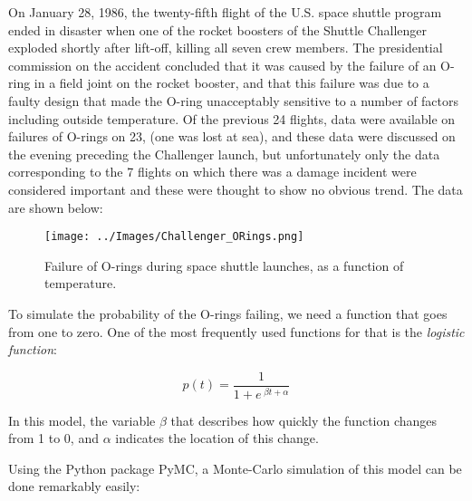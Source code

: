 On January 28, 1986, the twenty-fifth flight of the U.S. space shuttle program ended in disaster when one of the rocket boosters of the Shuttle Challenger exploded shortly after lift-off, killing all seven crew members. The presidential commission on the accident concluded that it was caused by the failure of an O-ring in a field joint on the rocket booster, and that this failure was due to a faulty design that made the O-ring unacceptably sensitive to a number of factors including outside temperature. Of the previous 24 flights, data were available on failures of O-rings on 23, (one was lost at sea), and these data were discussed on the evening preceding the Challenger launch, but unfortunately only the data corresponding to the 7 flights on which there was a damage incident were considered important and these were thought to show no obvious trend. The data are shown below:

\begin{figure}[H]
  \centering
  \texttt{[image: ../Images/Challenger\_ORings.png]}\\
  \caption{Failure of O-rings during space shuttle launches, as a function of temperature.}
\end{figure}

To simulate the probability of the O-rings failing, we need a function that goes from one to zero. One of the most frequently used functions for that is the \emph{logistic function}:

\begin{equation*}
  p(t) = \frac{1}{ 1 + e^{ \;\beta t + \alpha } }
\end{equation*}

In this model, the variable $\beta$ that describes how quickly the function changes from 1 to 0, and $\alpha$ indicates the location of this change.

Using the Python package PyMC, a Monte-Carlo simulation of this model can be done remarkably easily:

